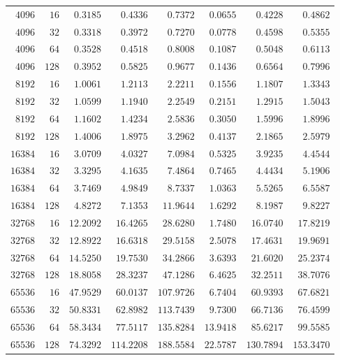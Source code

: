\begin{tabular}{rrrrrrrr}
${4096}$ & ${16}$ & $0.3185$ & $0.4336$ & $0.7372$ & $0.0655$ & $0.4228$ & $0.4862$ \\
${4096}$ & ${32}$ & $0.3318$ & $0.3972$ & $0.7270$ & $0.0778$ & $0.4598$ & $0.5355$ \\
${4096}$ & ${64}$ & $0.3528$ & $0.4518$ & $0.8008$ & $0.1087$ & $0.5048$ & $0.6113$ \\
${4096}$ & ${128}$ & $0.3952$ & $0.5825$ & $0.9677$ & $0.1436$ & $0.6564$ & $0.7996$ \\
${8192}$ & ${16}$ & $1.0061$ & $1.2113$ & $2.2211$ & $0.1556$ & $1.1807$ & $1.3343$ \\
${8192}$ & ${32}$ & $1.0599$ & $1.1940$ & $2.2549$ & $0.2151$ & $1.2915$ & $1.5043$ \\
${8192}$ & ${64}$ & $1.1602$ & $1.4234$ & $2.5836$ & $0.3050$ & $1.5996$ & $1.8996$ \\
${8192}$ & ${128}$ & $1.4006$ & $1.8975$ & $3.2962$ & $0.4137$ & $2.1865$ & $2.5979$ \\
${16384}$ & ${16}$ & $3.0709$ & $4.0327$ & $7.0984$ & $0.5325$ & $3.9235$ & $4.4544$ \\
${16384}$ & ${32}$ & $3.3295$ & $4.1635$ & $7.4864$ & $0.7465$ & $4.4434$ & $5.1906$ \\
${16384}$ & ${64}$ & $3.7469$ & $4.9849$ & $8.7337$ & $1.0363$ & $5.5265$ & $6.5587$ \\
${16384}$ & ${128}$ & $4.8272$ & $7.1353$ & $11.9644$ & $1.6292$ & $8.1987$ & $9.8227$ \\
${32768}$ & ${16}$ & $12.2092$ & $16.4265$ & $28.6280$ & $1.7480$ & $16.0740$ & $17.8219$ \\
${32768}$ & ${32}$ & $12.8922$ & $16.6318$ & $29.5158$ & $2.5078$ & $17.4631$ & $19.9691$ \\
${32768}$ & ${64}$ & $14.5250$ & $19.7530$ & $34.2866$ & $3.6393$ & $21.6020$ & $25.2374$ \\
${32768}$ & ${128}$ & $18.8058$ & $28.3237$ & $47.1286$ & $6.4625$ & $32.2511$ & $38.7076$ \\
${65536}$ & ${16}$ & $47.9529$ & $60.0137$ & $107.9726$ & $6.7404$ & $60.9393$ & $67.6821$ \\
${65536}$ & ${32}$ & $50.8331$ & $62.8982$ & $113.7439$ & $9.7300$ & $66.7136$ & $76.4599$ \\
${65536}$ & ${64}$ & $58.3434$ & $77.5117$ & $135.8284$ & $13.9418$ & $85.6217$ & $99.5585$ \\
${65536}$ & ${128}$ & $74.3292$ & $114.2208$ & $188.5584$ & $22.5787$ & $130.7894$ & $153.3470$ \\
\bottomrule
\end{tabular}

